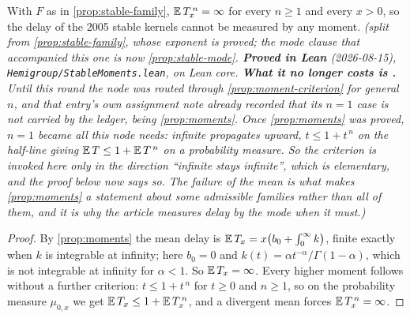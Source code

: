 \begin{proposition}\label{prop:stable-moments}
\leanok
With $F$ as in \ref{prop:stable-family}, $\mathbb{E}\,T_x^{\,n} = \infty$ for every $n \ge 1$ and every
$x > 0$, so the delay of the 2005 stable kernels cannot be measured by any moment.
\statusT\quad\emph{(split from \ref{prop:stable-family}, whose exponent is proved; the mode clause
that accompanied this one is now \ref{prop:stable-mode}. \textbf{Proved in Lean} (2026-08-15),
\texttt{Hemigroup/StableMoments.lean}, on Lean core.
\textbf{What it no longer costs is .} Until this round the node was routed through
\ref{prop:moment-criterion} for general $n$, and that entry's own assignment note already recorded
that its $n = 1$ case is not carried by the ledger, being \ref{prop:moments}. Once
\ref{prop:moments} was proved, $n = 1$ became all this node needs: infinite propagates upward,
$t \le 1 + t^{\,n}$ on the half-line giving $\mathbb{E}\,T \le 1 + \mathbb{E}\,T^{\,n}$ on a probability
measure. So the criterion is invoked here only in the direction ``infinite stays infinite'',
which is elementary, and the proof below now says so. The failure of the mean is what makes
\ref{prop:moments} a statement about \emph{some} admissible families rather than all of them, and
it is why the article measures delay by the mode when it must.)}
\end{proposition}

\begin{proof}
\leanok
By \ref{prop:moments} the mean delay is $\mathbb{E}\,T_x = x\bigl(b_0 + \int_0^\infty k\bigr)$, finite
exactly when $k$ is integrable at infinity; here $b_0 = 0$ and $k(t) = \alpha t^{-\alpha}/\Gamma(1
- \alpha)$, which is not integrable at infinity for $\alpha < 1$. So $\mathbb{E}\,T_x = \infty$. Every
higher moment follows without a further criterion: $t \le 1 + t^{\,n}$ for $t \ge 0$ and
$n \ge 1$, so on the probability measure $\mu_{0,x}$ we get $\mathbb{E}\,T_x \le 1 + \mathbb{E}\,T_x^{\,n}$, and
a divergent mean forces $\mathbb{E}\,T_x^{\,n} = \infty$.
\end{proof}


